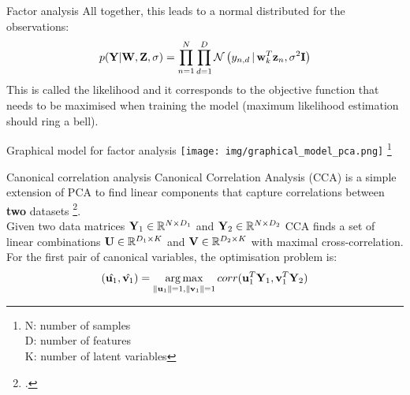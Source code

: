 \documentclass[aspectratio=169,notes]{beamer}
\newcommand\blfootnote[1]{%
  \begingroup
  \renewcommand\thefootnote{}\footnote{#1}%
  \addtocounter{footnote}{-1}%
  \endgroup
}
\begin{document}
	\begin{frame}{Factor analysis}
	All together, this leads to a normal distributed for the observations:
	\[
		p({\bf Y}|{\bf W},{\bf Z},\sigma) = \prod_{n=1}^{N} \prod_{d=1}^{D} \mathcal{N}\left(y_{n,d} \,|\, {\bf w}_{k}^T {\bf z}_{n},\sigma^2 {\bf I}\right)
	\]
	This is called the likelihood and it corresponds to the objective function that needs to be maximised when training the model (maximum likelihood estimation should ring a bell).
	\end{frame}

	\begin{frame}{Graphical model for factor analysis}
	\centering
	\texttt{[image: img/graphical\_model\_pca.png]}
	\blfootnote{N: number of samples\\D: number of features\\K: number of latent variables}
	\end{frame}


	\begin{frame}{Canonical correlation analysis}
	Canonical Correlation Analysis (CCA) is a simple extension of PCA to find linear components that capture correlations between \textbf{two} datasets \footcite{Hotteling1936}.\\
	\leavevmode\newline
	Given two data matrices ${\bf Y}_1 \in \mathbb{R}^{N \times D_1}$ and ${\bf Y}_2 \in \mathbb{R}^{N \times D_2}$ CCA finds a set of linear combinations ${\bf U} \in \mathbb{R}^{D_1 \times K}$ and ${\bf V} \in \mathbb{R}^{D_2 \times K}$ with maximal cross-correlation.\\ 
	\leavevmode\newline
	For the first pair of canonical variables, the optimisation problem is:
	\[
		(\hat{{\bf u}_1}, \hat{{\bf v}_1}) = \operatorname*{arg\,max}_{\|{\bf u}_1\|=1,\|{\bf v}_1\|=1} corr({\bf u}_{1}^T {\bf Y}_1, {\bf v}_{1}^T {\bf Y}_2)
	\]
	\end{frame}
\end{document}
